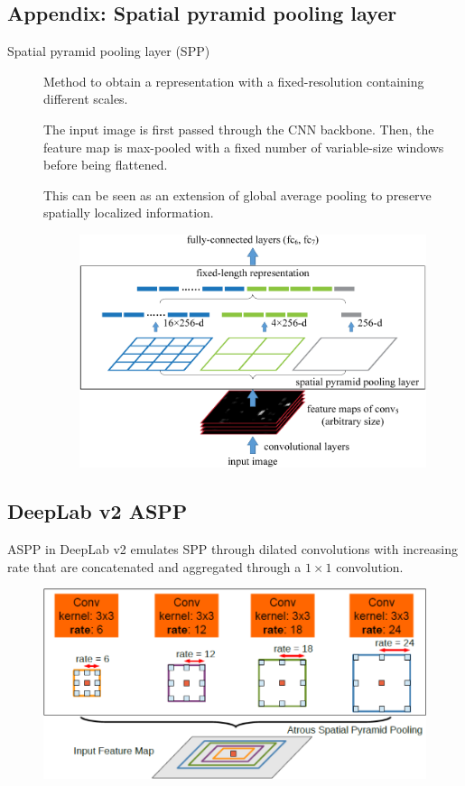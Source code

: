 \begin{subappendices}

\section{Appendix: Spatial pyramid pooling layer}
    \begin{description}
        \item[Spatial pyramid pooling layer (SPP)] 
            Method to obtain a representation with a fixed-resolution containing different scales.

            The input image is first passed through the CNN backbone. Then, the feature map is max-pooled with a fixed number of variable-size windows before being flattened.

            \begin{remark}
                This can be seen as an extension of global average pooling to preserve spatially localized information.
            \end{remark}

            \begin{figure}[H]
                \centering
                \includegraphics[width=0.5\linewidth]{./img/_spp.pdf}
            \end{figure}
    \end{description}


    \subsection{DeepLab v2 ASPP}

    ASPP in DeepLab v2 emulates SPP through dilated convolutions with increasing rate that are concatenated and aggregated through a $1 \times 1$ convolution.

    \begin{figure}[H]
        \centering
        \includegraphics[width=0.5\linewidth]{./img/aspp_deeplabv2.png}
    \end{figure}


\end{subappendices}
